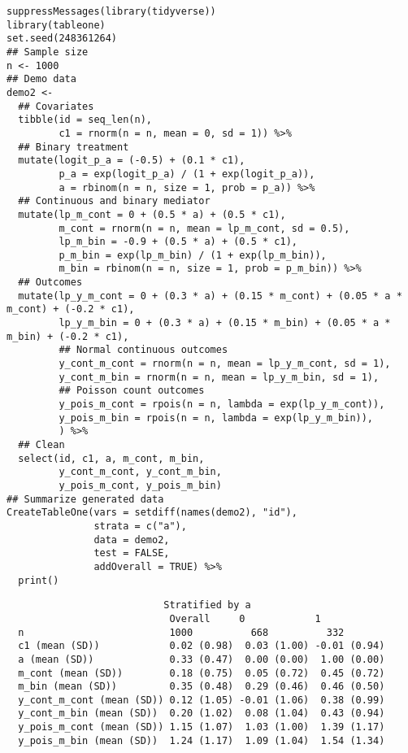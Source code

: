 \documentclass[10pt]{article}
\begin{document}
\scriptsize
\begin{verbatim}
suppressMessages(library(tidyverse))
library(tableone)
set.seed(248361264)
## Sample size
n <- 1000
## Demo data
demo2 <-
  ## Covariates
  tibble(id = seq_len(n),
         c1 = rnorm(n = n, mean = 0, sd = 1)) %>%
  ## Binary treatment
  mutate(logit_p_a = (-0.5) + (0.1 * c1),
         p_a = exp(logit_p_a) / (1 + exp(logit_p_a)),
         a = rbinom(n = n, size = 1, prob = p_a)) %>%
  ## Continuous and binary mediator
  mutate(lp_m_cont = 0 + (0.5 * a) + (0.5 * c1),
         m_cont = rnorm(n = n, mean = lp_m_cont, sd = 0.5),
         lp_m_bin = -0.9 + (0.5 * a) + (0.5 * c1),
         p_m_bin = exp(lp_m_bin) / (1 + exp(lp_m_bin)),
         m_bin = rbinom(n = n, size = 1, prob = p_m_bin)) %>%
  ## Outcomes
  mutate(lp_y_m_cont = 0 + (0.3 * a) + (0.15 * m_cont) + (0.05 * a * m_cont) + (-0.2 * c1),
         lp_y_m_bin = 0 + (0.3 * a) + (0.15 * m_bin) + (0.05 * a * m_bin) + (-0.2 * c1),
         ## Normal continuous outcomes
         y_cont_m_cont = rnorm(n = n, mean = lp_y_m_cont, sd = 1),
         y_cont_m_bin = rnorm(n = n, mean = lp_y_m_bin, sd = 1),
         ## Poisson count outcomes
         y_pois_m_cont = rpois(n = n, lambda = exp(lp_y_m_cont)),
         y_pois_m_bin = rpois(n = n, lambda = exp(lp_y_m_bin)),
         ) %>%
  ## Clean
  select(id, c1, a, m_cont, m_bin,
         y_cont_m_cont, y_cont_m_bin,
         y_pois_m_cont, y_pois_m_bin)
## Summarize generated data
CreateTableOne(vars = setdiff(names(demo2), "id"),
               strata = c("a"),
               data = demo2,
               test = FALSE,
               addOverall = TRUE) %>%
  print()
\end{verbatim}

\begin{verbatim}
                           Stratified by a
                            Overall     0            1           
  n                         1000          668          332       
  c1 (mean (SD))            0.02 (0.98)  0.03 (1.00) -0.01 (0.94)
  a (mean (SD))             0.33 (0.47)  0.00 (0.00)  1.00 (0.00)
  m_cont (mean (SD))        0.18 (0.75)  0.05 (0.72)  0.45 (0.72)
  m_bin (mean (SD))         0.35 (0.48)  0.29 (0.46)  0.46 (0.50)
  y_cont_m_cont (mean (SD)) 0.12 (1.05) -0.01 (1.06)  0.38 (0.99)
  y_cont_m_bin (mean (SD))  0.20 (1.02)  0.08 (1.04)  0.43 (0.94)
  y_pois_m_cont (mean (SD)) 1.15 (1.07)  1.03 (1.00)  1.39 (1.17)
  y_pois_m_bin (mean (SD))  1.24 (1.17)  1.09 (1.04)  1.54 (1.34)
\end{verbatim}
\end{document}
